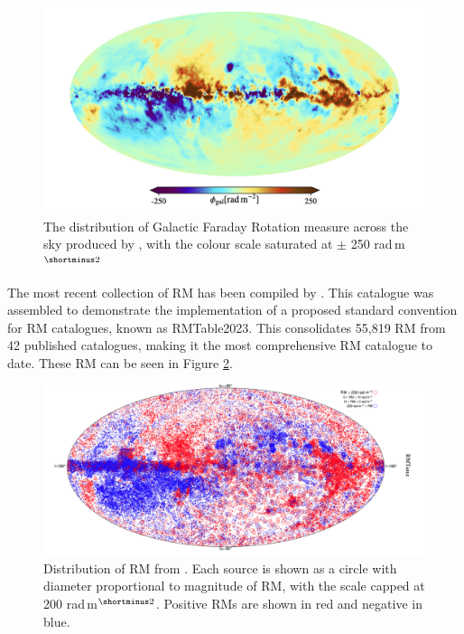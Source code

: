 \begin{figure}
    \centering
    \includegraphics[width=\linewidth]{Thesis_Template/Figures/Hutschenreuter2020.png}
    \caption{The distribution of Galactic Faraday Rotation measure across the sky produced by \cite{Hutschenreuter_2020}, with the colour scale saturated at $\pm$ 250 rad$\,$m$^{\shortminus2}$}
    \label{fig: Hutschenreuter 2020}
\end{figure}

The most recent collection of RM has been compiled by \cite{vanEck_2023}. This catalogue was assembled to demonstrate the implementation of a proposed standard convention for RM catalogues, known as RMTable2023. This consolidates 55,819 RM from 42 published catalogues, making it the most comprehensive RM catalogue to date. These RM can be seen in Figure \ref{fig:van eck map}.

\begin{figure}
    \centering
    \includegraphics[width=\linewidth]{Thesis_Template/Figures/van eck map.png}
    \caption{Distribution of RM from \cite{vanEck_2023}. Each source is shown as a circle with diameter proportional to magnitude of RM, with the scale capped at 200 rad$\,$m$^{\shortminus2}$. Positive RMs are shown in red and negative in blue.}
    \label{fig:van eck map}
\end{figure}

